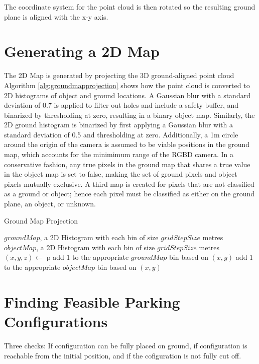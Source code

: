 The coordinate system for the point cloud is then rotated so the resulting
ground plane is aligned with the x-y axis.

\section{Generating a 2D Map}
The 2D Map is generated by projecting the 3D ground-aligned point cloud 
Algorithm \autoref{alg:groundmapprojection} shows how the point cloud is
converted to 2D histograms of object and ground locations. A Gaussian blur with
a standard deviation of 0.7 is applied to filter out holes and include a safety
buffer, and binarized by thresholding at zero, resulting in a binary object map.
Similarly, the 2D ground histogram is binarized by first applying a Gaussian
blur with a standard deviation of 0.5 and thresholding at zero. Additionally, a
1m circle around the origin of the camera is assumed to be viable positions in
the ground map, which accounts for the minimimum range of the RGBD camera. In a
conservative fashion, any true pixels in the ground map that shares a true value
in the object map is set to false, making the set of ground pixels and object
pixels mutually exclusive. A third map is created for pixels that are not
classified as a ground or object; hence each pixel must be classified as either
on the ground plane, an object, or unknown.

\begin{algorithm}
\caption{Ground Map Projection}
\label{alg:groundmapprojection}
\begin{algorithmic}[1]
\Statex
{}
    \State $groundMap$, a 2D Histogram with each bin of size $gridStepSize$ metres
    \State $objectMap$, a 2D Histogram with each bin of size $gridStepSize$ metres
        \State $(x,y,z) \gets$ p
            \State add $1$ to the appropriate $groundMap$ bin based on $(x,y)$
        \Else
            \State add $1$ to the appropriate $objectMap$ bin based on $(x,y)$
        \EndIf
    \EndFor
\EndFunction
\Statex
{}
\end{algorithmic}
\end{algorithm}

\section{Finding Feasible Parking Configurations}
Three checks: If configuration can be fully placed on ground, if configuration
is reachable from the initial position, and if the cofiguration is not fully cut
off.


